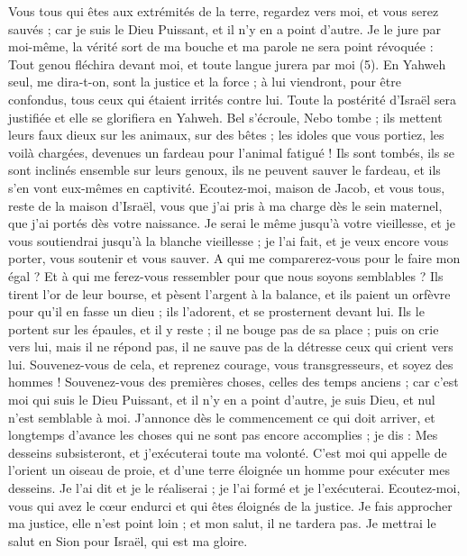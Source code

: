 \begin{multicols}{2}
Vous tous qui êtes aux extrémités de la terre, regardez vers moi, et vous serez sauvés ; car je suis le Dieu Puissant, et il n'y en a point d'autre.
Je le jure par moi-même, la vérité sort de ma bouche et ma parole ne sera point révoquée : Tout genou fléchira devant moi, et toute langue jurera par moi (5).
En Yahweh seul, me dira-t-on, sont la justice et la force ; à lui viendront, pour être confondus, tous ceux qui étaient irrités contre lui.
Toute la postérité d'Israël sera justifiée et elle se glorifiera en Yahweh.
\VerseOne{}Bel s’écroule, Nebo tombe ; ils mettent leurs faux dieux sur les animaux, sur des bêtes ; les idoles que vous portiez, les voilà chargées, devenues un fardeau pour l’animal fatigué !
Ils sont tombés, ils se sont inclinés ensemble sur leurs genoux, ils ne peuvent sauver le fardeau, et ils s’en vont eux-mêmes en captivité.
Ecoutez-moi, maison de Jacob, et vous tous, reste de la maison d'Israël, vous que j’ai pris à ma charge dès le sein maternel, que j’ai portés dès votre naissance.
Je serai le même jusqu’à votre vieillesse, et je vous soutiendrai jusqu’à la blanche vieillesse ; je l'ai fait, et je veux encore vous porter, vous soutenir et vous sauver.
A qui me comparerez-vous pour le faire mon égal ? Et à qui me ferez-vous ressembler pour que nous soyons semblables ?
Ils tirent l'or de leur bourse, et pèsent l'argent à la balance, et ils paient un orfèvre pour qu’il en fasse un dieu ; ils l'adorent, et se prosternent devant lui.
Ils le portent sur les épaules, et il y reste ; il ne bouge pas de sa place ; puis on crie vers lui, mais il ne répond pas, il ne sauve pas de la détresse ceux qui crient vers lui.
Souvenez-vous de cela, et reprenez courage, vous transgresseurs, et soyez des hommes !
Souvenez-vous des premières choses, celles des temps anciens ; car c'est moi qui suis le Dieu Puissant, et il n'y en a point d'autre, je suis Dieu, et nul n’est semblable à moi.
J’annonce dès le commencement ce qui doit arriver, et longtemps d’avance les choses qui ne sont pas encore accomplies ; je dis : Mes desseins subsisteront, et j’exécuterai toute ma volonté.
C’est moi qui appelle de l’orient un oiseau de proie, et d'une terre éloignée un homme pour exécuter mes desseins. Je l’ai dit et je le réaliserai ; je l’ai formé et je l’exécuterai.
Ecoutez-moi, vous qui avez le cœur endurci et qui êtes éloignés de la justice.
Je fais approcher ma justice, elle n’est point loin ; et mon salut, il ne tardera pas. Je mettrai le salut en Sion pour Israël, qui est ma gloire.

\end{multicols}
